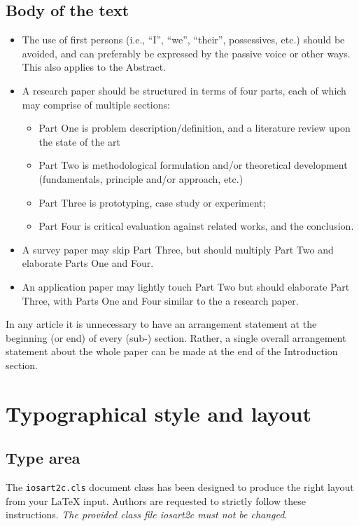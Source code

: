 \documentclass{iosart2c}
\begin{document}
\subsection{Body of the text}
\begin{itemize}
\item The use of first persons (i.e., ``I'', ``we'', ``their'', possessives, etc.) should be avoided,
and can preferably be expressed by the passive voice or other ways. This also applies to the Abstract.
\item A research paper should be structured in terms of four parts, each of which may comprise of multiple sections:
\begin{itemize}
\item Part One is problem description/definition, and a literature review upon the state of the
art
\item Part Two is methodological formulation and/or theoretical development (fundamentals, principle and/or approach,
etc.)
\item Part Three is prototyping, case study or experiment;
\item Part Four is critical evaluation against related works, and the
conclusion.
\end{itemize}
\item A survey paper may skip Part Three, but should multiply Part Two and elaborate Parts One and Four.
\item An application paper may lightly touch Part Two but should elaborate Part Three, with Parts One and Four similar to the a
research paper.
\end{itemize}

In any article it is unnecessary to have an arrangement statement at the beginning (or end) of every \mbox{(sub-)} section.
Rather, a single overall arrangement statement about the whole paper can be made at the end of the Introduction section.


\section{Typographical style and layout}

\subsection{Type area}

The \texttt{iosart2c.cls} document class has been designed to produce
the right layout from your \LaTeX{} input. Authors are requested to
strictly follow these instructions. \emph{The provided class file
iosart2c must not be changed}.
\end{document}
